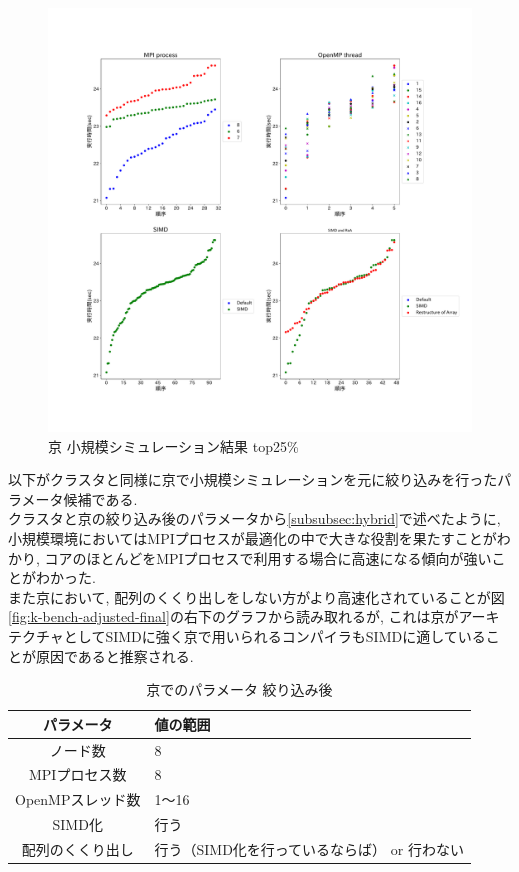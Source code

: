 \begin{figure}[htb]
\begin{center}
    \includegraphics[width=14cm]{./images/k-bench-top25.pdf}
    \caption{京 小規模シミュレーション結果 top25\%}
    \label{fig:k-bench-top25}
\end{center}
\end{figure}

以下がクラスタと同様に京で小規模シミュレーションを元に絞り込みを行ったパラメータ候補である.\\
クラスタと京の絞り込み後のパラメータから\ref{subsubsec:hybrid}で述べたように,
小規模環境においてはMPIプロセスが最適化の中で大きな役割を果たすことがわかり,
コアのほとんどをMPIプロセスで利用する場合に高速になる傾向が強いことがわかった.\\
また京において, 配列のくくり出しをしない方がより高速化されていることが図\ref{fig:k-bench-adjusted-final}の右下のグラフから読み取れるが,
これは京がアーキテクチャとしてSIMDに強く京で用いられるコンパイラもSIMDに適していることが原因であると推察される.
\begin{table}[htb]
  \caption {京でのパラメータ 絞り込み後}
  \begin{center}
    \begin{tabular}{|c|p{12cm}|}
      \hline
      パラメータ & 値の範囲\\ \hline
      ノード数 & 8\\ \hline
      MPIプロセス数 & 8\\ \hline
      OpenMPスレッド数 & 1〜16\\ \hline
      SIMD化 & 行う\\ \hline
      配列のくくり出し & 行う（SIMD化を行っているならば） or 行わない\\ \hline
    \end{tabular}
  \end{center}
\end{table}

